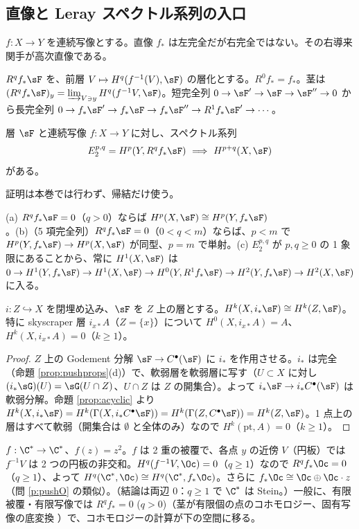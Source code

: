 \subsection{直像と Leray スペクトル系列の入口}
$f:X\to Y$ を連続写像とする。直像 $f_*$ は左完全だが右完全ではない。その右導来関手が高次直像である。
\begin{defn}[高次直像]\tC
$R^qf_*\sF$ を、前層 $V\mapsto H^q(f^{-1}(V),\sF)$ の層化とする。$R^0f_*=f_*$。茎は $(R^qf_*\sF)_y=\varinjlim_{V\ni y}H^q(f^{-1}V,\sF)$。短完全列 $0\to\sF'\to\sF\to\sF''\to0$ から長完全列 $0\to f_*\sF'\to f_*\sF\to f_*\sF''\to R^1f_*\sF'\to\cdots$。
\end{defn}
\begin{thm}\label{thm:Leray}\tC
層 $\sF$ と連続写像 $f:X\to Y$ に対し、スペクトル系列
\[
E_2^{p,q}=H^p(Y,R^qf_*\sF)\ \Longrightarrow\ H^{p+q}(X,\sF)
\]
がある。
\end{thm}
証明は本巻では行わず、帰結だけ使う。
\begin{cor}\label{cor:Lerayuse}\tC
(a) $R^qf_*\sF=0$（$q>0$）ならば $H^p(X,\sF)\cong H^p(Y,f_*\sF)$。(b)（5 項完全列）$R^qf_*\sF=0$（$0<q<m$）ならば、$p<m$ で $H^p(Y,f_*\sF)\to H^p(X,\sF)$ が同型、$p=m$ で単射。(c) $E_2^{p,q}$ が $p,q\ge0$ の 1 象限にあることから、常に $H^1(X,\sF)$ は $0\to H^1(Y,f_*\sF)\to H^1(X,\sF)\to H^0(Y,R^1f_*\sF)\to H^2(Y,f_*\sF)\to H^2(X,\sF)$ に入る。
\end{cor}
\begin{prop}[閉埋め込み]\label{prop:closedemb}\tP
$i:Z\hookrightarrow X$ を閉埋め込み、$\sF$ を $Z$ 上の層とする。$H^k(X,i_*\sF)\cong H^k(Z,\sF)$。特に skyscraper 層 $i_{x*}A$（$Z=\{x\}$）について $H^0(X,i_{x*}A)=A$、$H^k(X,i_{x*}A)=0$（$k\ge1$）。
\end{prop}
\begin{proof}
$Z$ 上の Godement 分解 $\sF\to C^\bullet(\sF)$ に $i_*$ を作用させる。$i_*$ は完全（命題 \ref{prop:pushprops}(d)）で、軟弱層を軟弱層に写す（$U\subset X$ に対し $(i_*\sG)(U)=\sG(U\cap Z)$、$U\cap Z$ は $Z$ の開集合）。よって $i_*\sF\to i_*C^\bullet(\sF)$ は軟弱分解。命題 \ref{prop:acyclic} より $H^k(X,i_*\sF)=H^k(\Gamma(X,i_*C^\bullet\sF))=H^k(\Gamma(Z,C^\bullet\sF))=H^k(Z,\sF)$。1 点上の層はすべて軟弱（開集合は $\emptyset$ と全体のみ）なので $H^k(\mathrm{pt},A)=0$（$k\ge1$）。\qedhere
\end{proof}
\begin{ex}[有限被覆と直像]\label{ex:finitecover}
$f:\C^*\to\C^*$、$f(z)=z^2$。$f$ は 2 重の被覆で、各点 $y$ の近傍 $V$（円板）では $f^{-1}V$ は 2 つの円板の非交和。$H^q(f^{-1}V,\Oc)=0$（$q\ge1$）なので $R^qf_*\Oc=0$（$q\ge1$）、よって $H^q(\C^*,\Oc)\cong H^q(\C^*,f_*\Oc)$。さらに $f_*\Oc\cong\Oc\oplus\Oc\cdot z$（問 \ref{p:pushO} の類似）。（結論は両辺 $0$：$q\ge1$ で $\C^*$ は Stein。）一般に、有限被覆・有限写像では $R^qf_*=0$ ($q>0$)（茎が有限個の点のコホモロジー、固有写像の底変換 \tC{}）で、コホモロジーの計算が下の空間に移る。
\end{ex}

